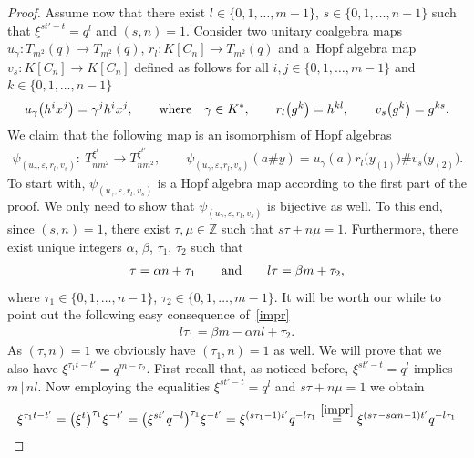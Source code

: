 \documentclass[11pt]{article}
\numberwithin{equation}{section}
\begin{document}
\begin{proof}
Assume now that there exist $l \in \{ 0, 1,\dots, m-1 \}$, $s \in \{ 0, 1,\dots, n-1 \}$ such that $\xi^{st' - t} = q^{l}$ and $(s, n) = 1$. Consider two unitary coalgebra maps $u_{\gamma}\colon T_{m^{2}}(q) \to T_{m^{2}}(q)$, $r_{l}\colon K[C_{n}] \to T_{m^{2}}(q)$ and a~Hopf algebra map $v_{s}\colon K[C_{n}] \to K[C_{n}]$ defined as follows for all $i, j \in \{0, 1,\dots, m-1\}$ and $k \in \{0, 1,\dots, n-1\}$
\begin{gather*}
u_{\gamma}\big(h^{i}x^{j}\big) = \gamma^{j} h^{i}x^{j}, \qquad {\rm where}\quad \gamma \in K^{*}, \qquad r_{l}\big(g^{k}\big) = h^{kl}, \qquad v_{s}\big(g^{k}\big) = g^{ks}.
\end{gather*}
We claim that the following map is an isomorphism of Hopf algebras
\begin{gather*}
\psi_{(u_{\gamma}, \varepsilon, r_{l}, v_{s})}\colon \ T_{nm^{2}}^ {\xi^{t}} \to T_{nm^{2}}^ {\xi^{t'}}, \qquad \psi_{(u_{\gamma}, \varepsilon, r_{l}, v_{s})}(a \# y) = u_{\gamma}(a) r_{l}\big(y_{(1)}\big) \# v_{s}\big(y_{(2)}\big).
\end{gather*}
To start with, $\psi_{(u_{\gamma}, \varepsilon, r_{l}, v_{s})}$ is a Hopf algebra map according to the first part of the proof. We only need to show that $\psi_{(u_{\gamma}, \varepsilon, r_{l}, v_{s})}$ is bijective as well. To this end, since $(s, n) = 1$, there exist $\tau,\mu \in \mathbb{Z}$ such that $s \tau + n \mu = 1$. Furthermore, there exist unique integers $\alpha$, $\beta$, $\tau_{1}$, $\tau_{2}$ such that
\begin{gather}\label{impr}
\tau = \alpha n + \tau_{1} \qquad {\rm and} \qquad l \tau = \beta m + \tau_{2},
\end{gather}
where $\tau_{1} \in \{0, 1,\dots, n-1\}$, $\tau_{2} \in \{0, 1,\dots, m-1\}$. It will be worth our while to point out the following easy consequence of~\eqref{impr}
\begin{gather}\label{impr2}
l\tau_{1} = \beta m - \alpha nl + \tau_{2}.
\end{gather}
As $(\tau, n) = 1$ we obviously have $(\tau_{1}, n) = 1$ as well. We will prove that we also have $\xi^{\tau_{1} t - t'} = q^{m-\tau_{2}}$. First recall that, as noticed before, $\xi^{st' - t} = q^{l}$ implies $m \,|\, nl$. Now employing the equalities $\xi^{st' - t} = q^{l}$ and $s \tau + n \mu = 1$ we obtain
\begin{gather*}
\xi^{\tau_{1} t - t'} = \big(\xi^{t}\big)^{\tau_{1}} \xi ^{-t'} = \big(\xi^{st'} q^{-l}\big)^{\tau_{1}} \xi ^{-t'} =
\xi^{(s\tau_{1} -1)t'} q^{-l\tau_{1}} \stackrel{\eqref{impr}} {=} \xi^{(s\tau - s \alpha n -1)t'} q^{-l\tau_{1}} \\

\end{gather*}
\end{proof}
\end{document}
